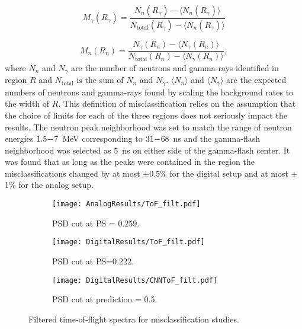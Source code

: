 \documentclass[main.tex]{subfiles}
\begin{document}
\begin{equation}
	M_\gamma(R_\gamma) = \frac{N_{n}(R_\gamma)-\langle N_n(R_\gamma)\rangle}{N_{\textrm{total}}(R_\gamma)-\langle N_n(R_\gamma)\rangle}
\end{equation}

\begin{equation}
	M_n(R_n) = \frac{N_{\gamma}(R_n)-\langle N_\gamma(R_n)\rangle}{N_{\textrm{total}}(R_n)-\langle N_\gamma(R_n)\rangle},
\end{equation}
where $N_n$ and $N_\gamma$ are the number of neutrons and gamma-rays identified in region $R$ and $N_{\textrm{total}}$ is the sum of $N_n$ and $N_\gamma$. $\langle N_n\rangle$ and $\langle N_\gamma\rangle$ are the expected numbers of neutrons and gamma-rays found by scaling the background rates to the width of $R$.
This definition of misclassification relies on the assumption that the choice of limits for each of the three regions does not seriously impact the results. The neutron peak neighborhood was set to match the range of neutron energies $1.5\--$\SI{7}{\MeV} corresponding to $31\--$\SI{68}{ns} and the gamma-flash neighborhood was selected as \SI{5}{\ns} on either side of the gamma-flash center.
It was found that as long as the peaks were contained in the region the misclassifications changed by at most $\pm$0.5\% for the digital setup and at most $\pm$1\% for the analog setup. 


\begin{figure}
    \centering
    \begin{subfigure}[bh]{\textwidth}
   	   	\centering
	    \texttt{[image: AnalogResults/ToF\_filt.pdf]}
    	\caption{PSD cut at PS = 0.259.}
    	\label{fig:ToF_filt_A}
   	\end{subfigure}
    \begin{subfigure}[bh]{\textwidth}
   	    \centering
        \texttt{[image: DigitalResults/ToF\_filt.pdf]}
        \caption{PSD cut at PS=0.222.}
        \label{fig:ToF_filt_D}
    \end{subfigure}
	\begin{subfigure}[bh]{\textwidth}
	    \centering
        \texttt{[image: DigitalResults/CNNToF\_filt.pdf]}
        \caption{PSD cut at prediction = 0.5.}
        \label{fig:ToF_filt_D_CNN}
    \end{subfigure}
	\caption[Filtered time-of-flight spectra for misclassification studies.]{Filtered time-of-flight spectra for misclassification studies.}
    \label{fig:tof_cc_cnn}
\end{figure}
\end{document}
